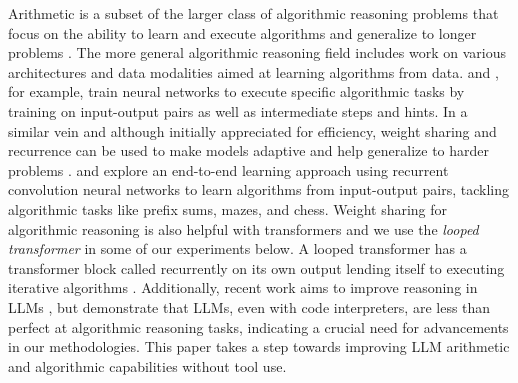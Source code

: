 \documentclass{article}
\begin{document}
Arithmetic is a subset of the larger class of algorithmic reasoning problems that focus on the ability to learn and execute algorithms and generalize to longer problems \citep{anil2022exploring, jelassi2023length, yang2023gpt, velivckovic2022clrs, rodionov2024discrete}.
The more general algorithmic reasoning field includes work on various architectures and data modalities aimed at learning algorithms from data. \citet{velivckovic2022clrs} and \citet{rodionov2024discrete}, for example,  train neural networks to execute specific algorithmic tasks by training on input-output pairs as well as intermediate steps and hints. 
In a similar vein and although initially appreciated for efficiency, weight sharing and recurrence can be used to make models adaptive and help generalize to harder problems \citep{dehghani2018universal, sukhbaatar-etal-2019-adaptive, Lan2020ALBERT, ibarz2022generalist}.
\citet{schwarzschild2021can} and \citet{bansal2022endtoend} explore an end-to-end learning approach using recurrent convolution neural networks to learn algorithms from input-output pairs, tackling algorithmic tasks like prefix sums, mazes, and chess. 
Weight sharing for algorithmic reasoning is also helpful with transformers and we use the \emph{looped transformer} in some of our experiments below.
A looped transformer has a transformer block called recurrently on its own output lending itself to executing iterative algorithms
\citep{giannou2023looped, yang2023looped, de2024simulation}.
Additionally, recent work aims to improve reasoning in LLMs \citep{zhou2023algorithms}, but
\citet{mcleish2024benchmarking} demonstrate that LLMs, even with code interpreters, are less than perfect at algorithmic reasoning tasks, indicating a crucial need for advancements in our methodologies. 
This paper takes a step towards improving LLM arithmetic and algorithmic capabilities without tool use.
\end{document}
